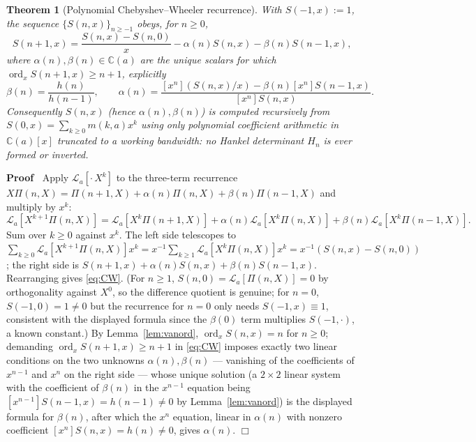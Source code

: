 \documentclass{article}
\newcommand{\assign}{:=}
\newcommand{\tmop}[1]{\ensuremath{\operatorname{#1}}}
\newenvironment{proof}{\noindent\textbf{Proof\ }}{\hspace*{\fill}$\Box$\medskip}
\newtheorem{theorem}{Theorem}
\newcommand{\ord}{\tmop{ord}}
\newcommand{\C}{\mathbb{C}}
\newcommand{\Lop}{\mathcal{L}}
\begin{document}
\begin{theorem}
  [Polynomial Chebyshev--Wheeler recurrence]\label{thm:CW} With $S (- 1, x)
  \assign 1$, the sequence $\{ S (n, x) \}_{n \ge - 1}$ obeys, for $n \ge 0$,
  \begin{equation}
    \label{eq:CW} S (n + 1, x) = \frac{S (n, x) - S (n, 0)}{x} - \alpha (n) S
    (n, x) - \beta (n) S (n - 1, x),
  \end{equation}
  where $\alpha (n), \beta (n) \in \C (a)$ are the unique scalars for which
  $\ord_x S (n + 1, x) \ge n + 1$, explicitly
  \[ \beta (n) = \frac{h (n)}{h (n - 1)}, \qquad \alpha (n) = \frac{[x^n]
     (S (n, x) / x) - \beta (n)  [x^n] S (n - 1, x)}{[x^n] S (n, x)} . \]
  Consequently $S (n, x)$ (hence $\alpha (n), \beta (n)$) is computed
  recursively from $S (0, x) = \sum_{k \ge 0} m (k, a) x^k$ using only
  polynomial coefficient arithmetic in $\C (a) [x]$ truncated to a working
  bandwidth: no Hankel determinant $H_n$ is ever formed or inverted.
\end{theorem}

\begin{proof}
  Apply $\Lop_a [\cdot \, X^k]$ to the three-term recurrence $X \Pi (n, X) =
  \Pi (n + 1, X) + \alpha (n) \Pi (n, X) + \beta (n) \Pi (n - 1, X)$ and
  multiply by $x^k$:
  \[ \Lop_a [X^{k + 1} \Pi (n, X)] = \Lop_a [X^k \Pi (n + 1, X)] + \alpha (n)
     \Lop_a [X^k \Pi (n, X)] + \beta (n) \Lop_a [X^k \Pi (n - 1, X)] . \]
  Sum over $k \ge 0$ against $x^k$. The left side telescopes to $\sum_{k \ge
  0} \Lop_a [X^{k + 1} \Pi (n, X)] x^k = x^{- 1} \sum_{k \ge 1} \Lop_a [X^k
  \Pi (n, X)] x^k = x^{- 1} (S (n, x) - S (n, 0))$; the right side is $S (n +
  1, x) + \alpha (n) S (n, x) + \beta (n) S (n - 1, x)$. Rearranging gives
  \eqref{eq:CW}. (For $n \ge 1$, $S (n, 0) = \Lop_a [\Pi (n, X)] = 0$ by
  orthogonality against $X^0$, so the difference quotient is genuine; for $n
  = 0$, $S (- 1, 0) = 1 \ne 0$ but the recurrence for $n = 0$ only needs
  $S(-1,x) \equiv 1$, consistent with the displayed formula since the
  $\beta(0)$ term multiplies $S(-1,\cdot)$, a known constant.) By
  Lemma~\ref{lem:vanord}, $\ord_x S (n, x) = n$ for $n \ge 0$; demanding
  $\ord_x S (n + 1, x) \ge n + 1$ in \eqref{eq:CW} imposes exactly two linear
  conditions on the two unknowns $\alpha (n), \beta (n)$ — vanishing of the
  coefficients of $x^{n - 1}$ and $x^n$ on the right side — whose unique
  solution (a $2 \times 2$ linear system with the coefficient of $\beta (n)$
  in the $x^{n - 1}$ equation being $[x^{n - 1}] S (n - 1, x) = h (n - 1) \ne
  0$ by Lemma~\ref{lem:vanord}) is the displayed formula for $\beta (n)$,
  after which the $x^n$ equation, linear in $\alpha (n)$ with nonzero
  coefficient $[x^n] S (n, x) = h (n) \ne 0$, gives $\alpha (n)$.
\end{proof}
\end{document}
